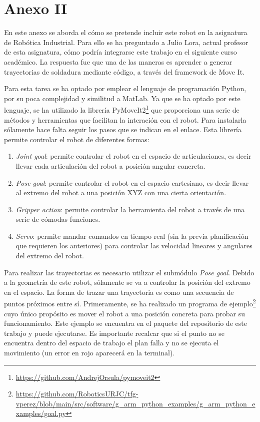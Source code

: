 \chapter*{Anexo II}
\label{cap:anexoii}

\noindent En este anexo se aborda el cómo se pretende incluir este robot en la asignatura de Robótica Industrial. Para ello 
se ha preguntado a Julio Lora, actual profesor de esta asignatura, cómo podría integrarse este trabajo en el siguiente curso académico. La respuesta 
fue que una de las maneras es aprender a generar trayectorias de soldadura mediante código, a través del framework de Move It. 


Para esta tarea se ha optado por emplear el lenguaje de programación Python, por su poca complejidad y similitud a MatLab. Ya que se ha optado por 
este lenguaje, se ha utilizado la librería PyMoveIt2\footnote{\url{https://github.com/AndrejOrsula/pymoveit2}} que proporciona una serie de métodos y herramientas que 
facilitan la interación con el robot. Para instalarla sólamente hace falta seguir los pasos que se indican en el enlace. Esta librería permite controlar 
el robot de diferentes formas:
\begin{enumerate}
\item \textit{Joint goal}: permite controlar el robot en el espacio de articulaciones, es decir llevar cada articulación del robot a posición angular concreta.
\item \textit{Pose goal}: permite controlar el robot en el espacio cartesiano, es decir llevar al extremo del robot a una posición XYZ con una 
cierta orientación.
\item \textit{Gripper action}: permite controlar la herramienta del robot a través de una serie de cómodas funciones.
\item \textit{Servo}: permite mandar comandos en tiempo real (sin la previa planificación que requieren los anteriores) para controlar las velocidad lineares y 
angulares del extremo del robot.

\end{enumerate}

Para realizar las trayectorias es necesario utilizar el submódulo \textit{Pose goal}. Debido a la geometría de este robot, sólamente se va a controlar la posición 
del extremo en el espacio. La forma de trazar una trayectoria es como una secuencia de puntos próximos entre sí. Primeramente, se ha realizado un 
programa de ejemplo\footnote{\url{https://github.com/RoboticsURJC/tfg-vperez/blob/main/src/software/g\_arm\_python_examples/g\_arm_python\_examples/goal.py}} 
cuyo único propósito es mover el robot a una posición concreta para probar su funcionamiento. Este ejemplo se encuentra en el paquete
  del repositorio de este trabajo y puede ejecutarse. Es importante recalcar que si el punto no se encuentra dentro del 
espacio de trabajo el plan falla y no se ejecuta el movimiento (un error en rojo aparecerá en la terminal).


